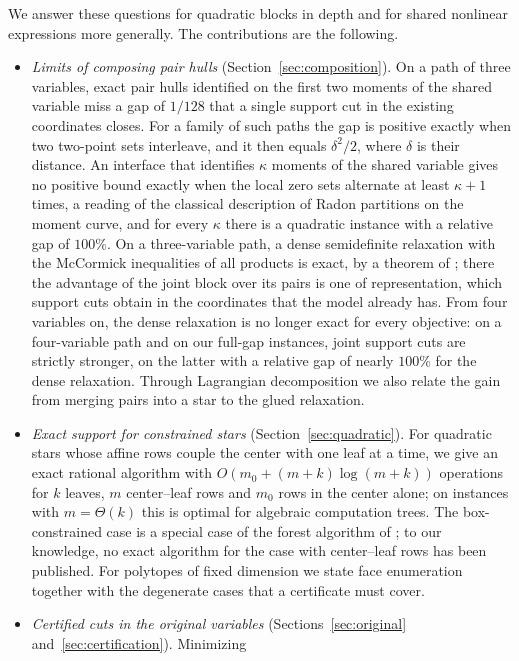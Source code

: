 We answer these questions for quadratic blocks in depth and for shared
nonlinear expressions more generally. The contributions are the following.

\begin{itemize}
\item \emph{Limits of composing pair hulls} (Section~\ref{sec:composition}). On
a path of three variables, exact pair hulls identified on the first two
moments of the shared variable miss a gap of $1/128$ that a single support
cut in the existing coordinates closes. For a family of such paths the gap is
positive exactly when two two-point sets interleave, and it then equals
$\delta^2/2$, where $\delta$ is their distance. An interface that identifies
$\kappa$ moments of the shared variable gives no positive bound exactly
when the local zero sets alternate at least $\kappa+1$ times, a reading of the
classical description of Radon partitions on the moment curve, and for every
$\kappa$ there is a quadratic instance with a relative gap of $100\%$. On a
three-variable path, a dense semidefinite relaxation with the McCormick
inequalities of all products is exact, by a theorem of
\citet{BurerNatarajanWillemsen2025}; there the advantage of the joint block
over its pairs is one of representation, which support cuts obtain in the
coordinates that the model already has. From four variables on, the dense
relaxation is no longer exact for every objective: on a four-variable path and
on our full-gap instances, joint support cuts are strictly stronger, on the
latter with a relative gap of nearly $100\%$ for the dense relaxation.
Through Lagrangian decomposition we also relate the gain from merging pairs
into a star to the glued relaxation.
\item \emph{Exact support for constrained stars} (Section~\ref{sec:quadratic}).
For quadratic stars whose affine rows couple the center with one leaf at a
time, we give an exact rational algorithm with $O(m_0+(m+k)\log(m+k))$
operations for $k$ leaves, $m$ center--leaf rows and $m_0$ rows in the center
alone; on instances with $m=\Theta(k)$ this is optimal for algebraic
computation trees. The box-constrained case is a special case of the forest
algorithm of \citet{DelPiaKhajavirad2026}; to our knowledge, no exact
algorithm for the case with center--leaf rows has been published. For
polytopes of fixed dimension we state face enumeration together with the
degenerate cases that a certificate must cover.
\item \emph{Certified cuts in the original variables}
(Sections~\ref{sec:original} and~\ref{sec:certification}). Minimizing

\end{itemize}
